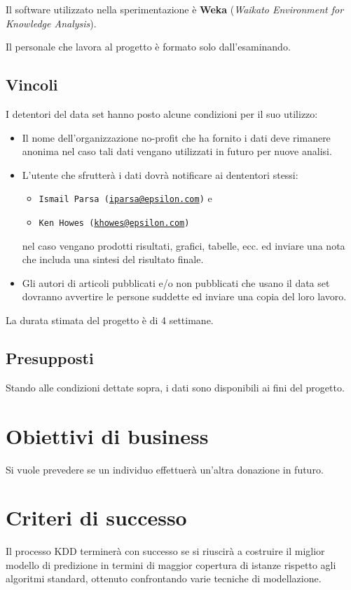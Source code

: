Il software utilizzato nella sperimentazione è \textbf{Weka} (\textit{Waikato Environment for Knowledge Analysis}).

Il personale che lavora al progetto è formato solo dall'esaminando.

\subsection{Vincoli}
I detentori del data set hanno posto alcune condizioni per il suo utilizzo:
\begin{itemize}
	\item Il nome dell'organizzazione no-profit che ha fornito i dati deve rimanere anonima nel caso tali dati vengano utilizzati in futuro per nuove analisi.
	
	\item L'utente che sfrutterà i dati dovrà notificare ai dententori stessi:
	 	\begin{itemize}
	 	
		\item \texttt{Ismail Parsa (\href{mailto:iparsa@epsilon.com}{iparsa@epsilon.com})} e

		\item \texttt{Ken Howes (\href{mailto:khowes@epsilon.com}{khowes@epsilon.com})}
		
		\end{itemize}
	nel caso vengano prodotti risultati, grafici, tabelle, ecc. ed inviare una nota che includa una sintesi del risultato finale.

	\item Gli autori di articoli pubblicati e/o non pubblicati che usano il data set dovranno avvertire le persone suddette ed inviare una copia del loro lavoro.
\end{itemize}

La durata stimata del progetto è di 4 settimane.

\subsection{Presupposti}
Stando alle condizioni dettate sopra, i dati sono disponibili ai fini del progetto.

\section{Obiettivi di business}
Si vuole prevedere se un individuo effettuerà un'altra donazione in futuro.

\section{Criteri di successo}
Il processo KDD terminerà con successo se si riuscirà a costruire il miglior modello di predizione in termini di maggior copertura di istanze rispetto agli algoritmi standard, ottenuto confrontando varie tecniche di modellazione.

